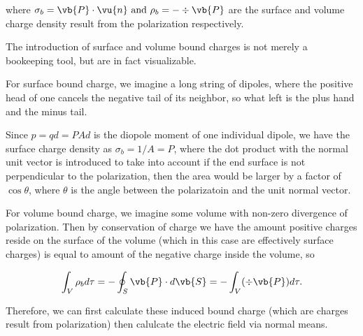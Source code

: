 \documentclass[english,a4paper,12pt]{report}
\begin{document}
where \(\sigma _{b} = \vb{P} \cdot \vu{n} \text { and } \rho _{b} = - \div{\vb{P} } \) are the surface and volume charge density result from the polarization respectively.

The introduction of surface and volume bound charges is not merely a bookeeping tool, but are in fact visualizable. 

For surface bound charge, we imagine a long string of dipoles, where the positive head of one cancels the negative tail of its neighbor, so what left is the plus hand and the minus tail.

Since \(p = qd = PAd\) is the diopole moment of one individual dipole, we have the surface charge density as \(\sigma _{b} = 1 /A = P\), where the dot product with the normal unit vector is introduced to take into account if the end surface is not perpendicular to the polarization, then the area would be larger by a factor of \(\cos \theta \), where \(\theta \) is the angle between the polarizatoin and the unit normal vector.

For volume bound charge, we imagine some volume with non-zero divergence of polarization. Then by conservation of charge we have the amount positive charges reside on the surface of the volume (which in this case are effectively surface charges) is equal to amount of the negative charge inside the volume, so

\begin{equation}
    \int_{V}^{} \rho _{b} d\tau = - \oint_{S} \vb{P} \cdot d\vb{S} = - \int_{V}^{} (\div{\vb{P} } )d\tau . 
\end{equation}

Therefore, we can first calculate these induced bound charge (which are charges result from polarization) then calulcate the electric field via normal means.
\end{document}
